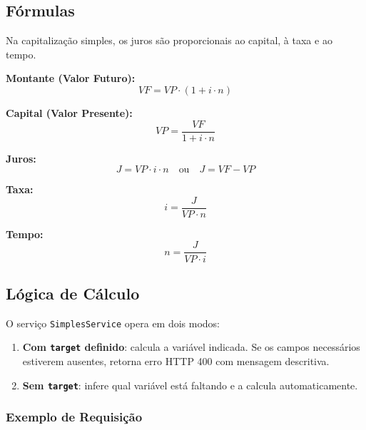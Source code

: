 \documentclass[12pt,a4paper]{article}
\begin{document}
\subsection{Fórmulas}

Na capitalização simples, os juros são proporcionais ao capital, à taxa e ao tempo.

\begin{tcolorbox}[colback=white,colframe=teal600,title=Fórmulas --- Juros Simples]

\textbf{Montante (Valor Futuro):}
\begin{equation}
  VF = VP \cdot (1 + i \cdot n)
\end{equation}

\textbf{Capital (Valor Presente):}
\begin{equation}
  VP = \frac{VF}{1 + i \cdot n}
\end{equation}

\textbf{Juros:}
\begin{equation}
  J = VP \cdot i \cdot n \quad \text{ou} \quad J = VF - VP
\end{equation}

\textbf{Taxa:}
\begin{equation}
  i = \frac{J}{VP \cdot n}
\end{equation}

\textbf{Tempo:}
\begin{equation}
  n = \frac{J}{VP \cdot i}
\end{equation}

\end{tcolorbox}

\subsection{Lógica de Cálculo}

O serviço \texttt{SimplesService} opera em dois modos:

\begin{enumerate}
  \item \textbf{Com \texttt{target} definido}: calcula a variável indicada. Se os campos necessários estiverem ausentes, retorna erro HTTP 400 com mensagem descritiva.
  \item \textbf{Sem \texttt{target}}: infere qual variável está faltando e a calcula automaticamente.
\end{enumerate}

\subsubsection{Exemplo de Requisição}
\end{document}
